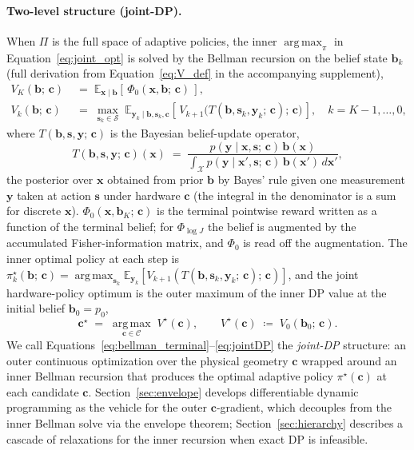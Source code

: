 \documentclass[11pt,a4paper,onecolumn]{article}
\newcommand{\E}{\mathbb{E}}
\newcommand{\argmax}{\operatorname*{arg\,max}}
\newcommand{\bb}{\bm{b}}
\newcommand{\bx}{\bm{x}}
\newcommand{\bc}{\bm{c}}
\newcommand{\bs}{\bm{s}}
\newcommand{\by}{\bm{y}}
\begin{document}
\paragraph{Two-level structure (joint-DP).}  When $\Pi$ is the full space of adaptive policies, the inner $\argmax_\pi$ in Equation~\eqref{eq:joint_opt} is solved by the Bellman recursion on the belief state $\bb_k$ (full derivation from Equation~\eqref{eq:V_def} in the accompanying supplement),
\begin{align}
V_K(\bb;\, \bc) &\;=\; \E_{\bx \mid \bb}\!\left[\,\Phi_0(\bx, \bb;\, \bc)\,\right], \label{eq:bellman_terminal}\\
V_k(\bb;\, \bc) &\;=\; \max_{\bs_k \in \mathcal{S}}\; \E_{\by_k \mid \bb, \bs_k, \bc}\!\left[\,V_{k+1}\!\bigl(T(\bb, \bs_k, \by_k;\, \bc);\, \bc\bigr)\,\right], \quad k = K-1, \ldots, 0,
\label{eq:bellman}
\end{align}
where $T(\bb, \bs, \by;\, \bc)$ is the Bayesian belief-update operator,
\begin{equation}
T(\bb, \bs, \by;\, \bc)(\bx) \;=\; \frac{p(\by \mid \bx, \bs;\, \bc)\, \bb(\bx)}{\int_{\mathcal{X}} p(\by \mid \bx', \bs;\, \bc)\, \bb(\bx')\, d\bx'},
\label{eq:belief_update}
\end{equation}
the posterior over $\bx$ obtained from prior $\bb$ by Bayes' rule given one measurement $\by$ taken at action $\bs$ under hardware $\bc$ (the integral in the denominator is a sum for discrete $\bx$).  $\Phi_0(\bx, \bb_K;\, \bc)$ is the terminal pointwise reward written as a function of the terminal belief; for $\Phi_{\log J}$ the belief is augmented by the accumulated Fisher-information matrix, and $\Phi_0$ is read off the augmentation.  The inner optimal policy at each step is $\pi^\star_k(\bb;\, \bc) = \argmax_{\bs_k} \E_{\by_k}[V_{k+1}(T(\bb, \bs_k, \by_k;\, \bc);\, \bc)]$, and the joint hardware-policy optimum is the outer maximum of the inner DP value at the initial belief $\bb_0 = p_0$,
\begin{equation}
\boxed{\;\bc^\star \;=\; \argmax_{\bc \in \mathcal{C}}\; V^\star(\bc), \qquad V^\star(\bc) \;\coloneqq\; V_0(\bb_0;\, \bc).\;}
\label{eq:jointDP}
\end{equation}
We call Equations~\eqref{eq:bellman_terminal}--\eqref{eq:jointDP} the \emph{joint-DP} structure: an outer continuous optimization over the physical geometry $\bc$ wrapped around an inner Bellman recursion that produces the optimal adaptive policy $\pi^\star(\bc)$ at each candidate $\bc$.  Section~\ref{sec:envelope} develops differentiable dynamic programming as the vehicle for the outer $\bc$-gradient, which decouples from the inner Bellman solve via the envelope theorem; Section~\ref{sec:hierarchy} describes a cascade of relaxations for the inner recursion when exact DP is infeasible.
\end{document}
